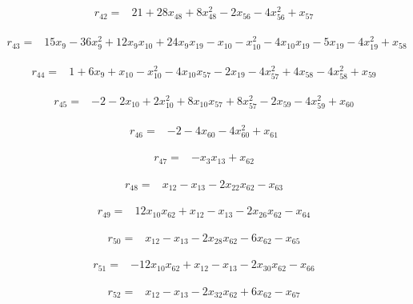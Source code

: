 \documentclass[10pt,letterpaper]{article}
\theoremstyle{remark}\newtheorem{remark}[theorem]{Remark}
\begin{document}
\begin{align*}
r_{42}={}&21+28x_{48}+8x_{48}^{2}-2x_{56}-4x_{56}^{2}+x_{57}
\end{align*}

\begin{align*}
r_{43}={}&15x_{9}-36x_{9}^{2}+12x_{9}x_{10}+24x_{9}x_{19}-x_{10}-x_{10}^{2}-4x_{10}x_{19}-5x_{19}-4x_{19}^{2}+x_{58}
\end{align*}

\begin{align*}
r_{44}={}&1+6x_{9}+x_{10}-x_{10}^{2}-4x_{10}x_{57}-2x_{19}-4x_{57}^{2}+4x_{58}-4x_{58}^{2}+x_{59}
\end{align*}

\begin{align*}
r_{45}={}&-2-2x_{10}+2x_{10}^{2}+8x_{10}x_{57}+8x_{57}^{2}-2x_{59}-4x_{59}^{2}+x_{60}
\end{align*}

\begin{align*}
r_{46}={}&-2-4x_{60}-4x_{60}^{2}+x_{61}
\end{align*}

\begin{align*}
r_{47}={}&-x_{3}x_{13}+x_{62}
\end{align*}

\begin{align*}
r_{48}={}&x_{12}-x_{13}-2x_{22}x_{62}-x_{63}
\end{align*}

\begin{align*}
r_{49}={}&12x_{10}x_{62}+x_{12}-x_{13}-2x_{26}x_{62}-x_{64}
\end{align*}

\begin{align*}
r_{50}={}&x_{12}-x_{13}-2x_{28}x_{62}-6x_{62}-x_{65}
\end{align*}

\begin{align*}
r_{51}={}&-12x_{10}x_{62}+x_{12}-x_{13}-2x_{30}x_{62}-x_{66}
\end{align*}

\begin{align*}
r_{52}={}&x_{12}-x_{13}-2x_{32}x_{62}+6x_{62}-x_{67}
\end{align*}
\end{document}
